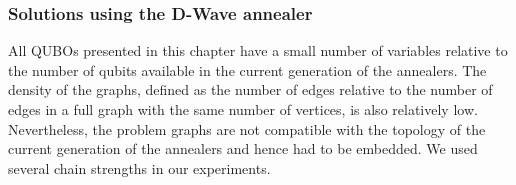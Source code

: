 \subsubsection{Solutions using the D-Wave annealer}

All QUBOs presented in this chapter have a small number of variables relative
to the number of qubits available in the current generation of the annealers. The density of
the graphs, defined as the number of edges relative to the number of edges in a full graph with
the same number of vertices, is also relatively low. Nevertheless, the problem graphs are not
compatible with the topology of the current generation of the annealers and hence had to be
embedded. We used several chain strengths in our experiments.

